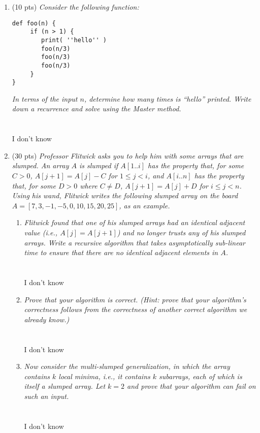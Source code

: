 \documentclass[12pt]{article}
\newcommand{\makenonemptybox}[2]{%
\item[]
\fbox{%
\parbox[c][#1][t]{\dimexpr\linewidth-2\fboxsep-2\fboxrule}{
  \hrule width \hsize height 0pt
  #2
 }%
}%
\par\vspace{\ht\strutbox}
}
\begin{document}
\begin{enumerate}
\begin{enumerate}
\item \label{1d} $T(n) = T(n^{1/2}) + 1$ if $n>2$ , and $T(n) = 0$ otherwise
\makenonemptybox{2.5in}{}
\end{enumerate}

\pagebreak

\item \label{2} (10 pts) {\itshape Consider the following function:}
\begin{small}
\begin{verbatim}
def foo(n) {
     if (n > 1) {
        print( ''hello'' )
        foo(n/3)
        foo(n/3)
        foo(n/3)
     }
}
\end{verbatim}
\end{small}
{\itshape In terms of the input $n$, determine how many times is ``hello''
printed. Write down a recurrence and solve using the Master method.}
\\ \\ \\ I don't know
\pagebreak


\item (30 pts) {\itshape Professor Flitwick asks you to help him with some
arrays that are slumped. An array $A$ is slumped if $A[1..i]$ has the property
that, for some $C>0$, $A[j+1] = A[j] - C$ for $1\leq j < i$, and 
$A[i..n]$ has the property that, for some $D>0$ where $C\neq D$,
$A[j+1] = A[j] + D$ for $i\leq j < n$.  Using his wand, Flitwick writes the
following slumped array on
the board $A=[7, 3, -1, -5, 0, 10, 15, 20, 25]$, as an example.}
	
\begin{enumerate}
    \item \label{3a} {\itshape Flitwick found that one of his slumped arrays
had an identical adjacent value (i.e., $A[j] = A[j+1]$) and no longer trusts
any of his slumped arrays. Write a recursive algorithm that takes
asymptotically sub-linear time to ensure that there are no identical adjacent
elements in $A$. }
\\ \\ \\ I don't know
\pagebreak
\item \label{3b} {\itshape Prove that your algorithm is correct. (Hint: prove
that your algorithm's correctness follows from the correctness of another
correct algorithm we already know.) }
\\ \\ \\ I don't know
\pagebreak
\item \label{3c} {\itshape Now consider the \textit{multi-slumped}
generalization, in which the array contains $k$ local minima, i.e., it contains
$k$ subarrays, each of which is itself a slumped array. Let $k=2$ and prove
that your algorithm can fail on such an input.}
\\ \\ \\ I don't know


\end{enumerate}
\end{enumerate}
\end{document}
